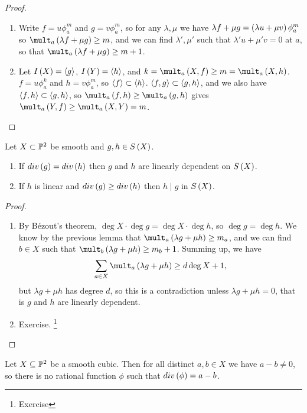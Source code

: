 \begin{proof}
\hfill
\begin{enumerate}
\item Write $ f = u\phi_a^m $ and $ g = v\phi_a^m $, so for any $ \lambda, \mu $ we have $ \lambda f + \mu g = \br{\lambda u + \mu v}\phi_a^m $ so $ \mult_a \br{\lambda f + \mu g} \ge m $, and we can find $ \lambda', \mu' $ such that $ \lambda'u + \mu'v = 0 $ at $ a $, so that $ \mult_a \br{\lambda f + \mu g} \ge m + 1 $.
\item Let $ I\br{X} = \abr{g} $, $ I\br{Y} = \abr{h} $, and $ k = \mult_a \br{X, f} \ge m = \mult_a \br{X, h} $. $ f = u\phi_a^k $ and $ h = v\phi_a^m $, so $ \left\langle f \right\rangle \subset \left\langle h \right\rangle $. $ \left\langle f, g \right\rangle \subset \left\langle g, h \right\rangle $, and we also have $ \left\langle f, h \right\rangle \subset \left\langle g, h \right\rangle $, so $ \mult_a \br{f, h} \ge \mult_a \br{g, h} $ gives $ \mult_a \br{Y, f} \ge \mult_a \br{X, Y} = m $.
\end{enumerate}
\end{proof}

\pagebreak

\begin{lemma}
Let $ X \subset \mathbb{P}^2 $ be smooth and $ g, h \in S\br{X} $.
\begin{enumerate}
\item If $ div\br{g} = div\br{h} $ then $ g $ and $ h $ are linearly dependent on $ S\br{X} $.
\item If $ h $ is linear and $ div\br{g} \ge div\br{h} $ then $ h \mid g $ in $ S\br{X} $.
\end{enumerate}
\end{lemma}

\begin{proof}
\hfill
\begin{enumerate}
\item By B\'ezout's theorem, $ \deg X \cdot \deg g = \deg X \cdot \deg h $, so $ \deg g = \deg h $. We know by the previous lemma that $ \mult_a \br{\lambda g + \mu h} \ge m_a $, and we can find $ b \in X $ such that $ \mult_b \br{\lambda g + \mu h} \ge m_b + 1 $. Summing up, we have
$$ \sum_{a \in X} \mult_a \br{\lambda g + \mu h} \ge d\deg X + 1, $$
but $ \lambda g + \mu h $ has degree $ d $, so this is a contradiction unless $ \lambda g + \mu h = 0 $, that is $ g $ and $ h $ are linearly dependent.
\item Exercise. \footnote{Exercise}
\end{enumerate}
\end{proof}

\begin{proposition}
Let $ X \subseteq \mathbb{P}^2 $ be a smooth cubic. Then for all distinct $ a, b \in X $ we have $ a - b \ne 0 $, so there is no rational function $ \phi $ such that $ div\br{\phi} = a - b $.
\end{proposition}

